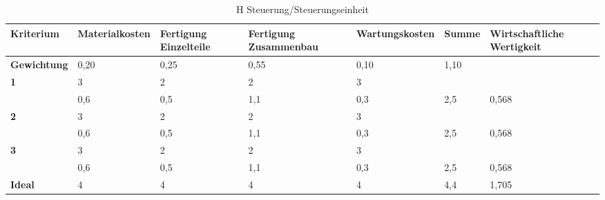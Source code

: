 \documentclass[10pt,a4paper]{article}
\begin{document}
\begin{table}[h!]
    \centering
    \hspace*{0in} %
    \begin{tabular}{>{\bfseries}p{2cm} p{2.2cm} p{2cm} p{2cm} p{2.5cm} p{2cm} p{2cm}}
        \toprule
        Kriterium  & Materialkosten & Fertigung Einzelteile & Fertigung Zusammenbau & Wartungskosten & Summe & Wirtschaftliche Wertigkeit \\
        \midrule
        Gewichtung & 0,20           & 0,25                  & 0,55                  & 0,10           & 1,10  &                            \\
        \midrule
        1          & 3              & 2                     & 2                     & 3              &       &                            \\
                   & 0,6            & 0,5                   & 1,1                   & 0,3            & 2,5   & 0,568                      \\
        \midrule
        2          & 3              & 2                     & 2                     & 3              &       &                            \\
                   & 0,6            & 0,5                   & 1,1                   & 0,3            & 2,5   & 0,568                      \\
        \midrule
        3          & 3              & 2                     & 2                     & 3              &       &                            \\
                   & 0,6            & 0,5                   & 1,1                   & 0,3            & 2,5   & 0,568                      \\
        \midrule
        Ideal      & 4              & 4                     & 4                     & 4              & 4,4   & 1,705                      \\
        \bottomrule
    \end{tabular}
    \caption{H Steuerung/Steuerungseinheit}
\end{table}
\end{document}
